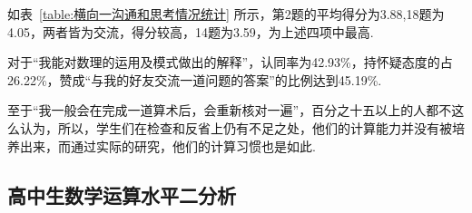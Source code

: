 \begin{enumerate}[(1)]
  如表~\ref{table:横向一沟通和思考情况统计} 所示，第2题的平均得分为3.88,18题为4.05，两者皆为交流，得分较高，14题为3.59，为上述四项中最高.

  对于“我能对数理的运用及模式做出的解释”，认同率为42.93\%，持怀疑态度的占26.22\%，赞成“与我的好友交流一道问题的答案”的比例达到45.19\%.

  至于“我一般会在完成一道算术后，会重新核对一遍”，百分之十五以上的人都不这么认为，所以，学生们在检查和反省上仍有不足之处，他们的计算能力并没有被培养出来，而通过实际的研究，他们的计算习惯也是如此.
\end{enumerate}


\subsection{高中生数学运算水平二分析}

